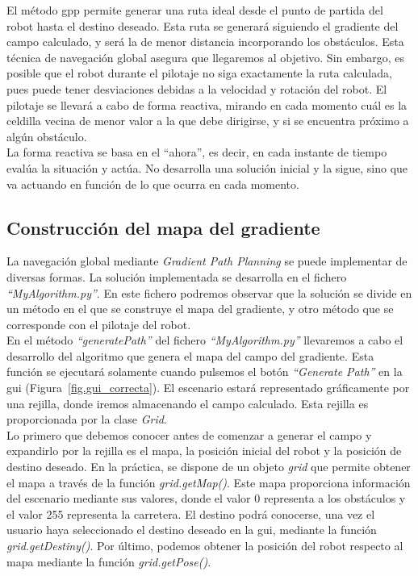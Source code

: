 El método \acrshort{gpp} permite generar una ruta ideal desde el punto de partida del robot hasta el destino deseado. Esta ruta se generará siguiendo el gradiente del campo calculado, y será la de menor distancia incorporando los obstáculos. Esta técnica de navegación global asegura que llegaremos al objetivo. Sin embargo, es posible que el robot durante el pilotaje no siga exactamente la ruta calculada, pues puede tener desviaciones debidas a la velocidad y rotación del robot. El pilotaje se llevará a cabo de forma reactiva, mirando en cada momento cuál es la celdilla vecina de menor valor a la que debe dirigirse, y si se encuentra próximo a algún obstáculo.\\

La forma reactiva se basa en el ``ahora'', es decir, en cada instante de tiempo evalúa la situación y actúa. No desarrolla una solución inicial y la sigue, sino que va actuando en función de lo que ocurra en cada momento.

\subsection{Construcción del mapa del gradiente}
La navegación global mediante \textit{Gradient Path Planning} se puede implementar de diversas formas. La solución implementada  se desarrolla en el fichero \textit{``MyAlgorithm.py''}. En este fichero podremos observar que la solución se divide en un método en el que se construye el mapa del gradiente, y otro método que se corresponde con el pilotaje del robot.\\

En el método \textit{``generatePath''} del fichero \textit{``MyAlgorithm.py''} llevaremos a cabo el desarrollo del algoritmo que genera el mapa del campo del gradiente. Esta función se ejecutará solamente cuando pulsemos el botón \textit{``Generate Path''} en la \acrshort{gui} (Figura~\ref{fig.gui_correcta}). El escenario estará representado gráficamente por una rejilla, donde iremos almacenando el campo calculado. Esta rejilla es proporcionada por la clase \textit{Grid}.\\

Lo primero que debemos conocer antes de comenzar a generar el campo y expandirlo por la rejilla es el mapa, la posición inicial del robot y la posición de destino deseado. En la práctica, se dispone de un objeto \textit{grid} que permite obtener el mapa a través de la función \textit{grid.getMap()}. Este mapa proporciona información del escenario mediante sus valores, donde el valor 0 representa a los obstáculos y el valor 255 representa la carretera. El destino podrá conocerse, una vez el usuario haya seleccionado el destino deseado en la \acrshort{gui}, mediante la función \textit{grid.getDestiny()}. Por último, podemos obtener la posición del robot respecto al mapa mediante la función \textit{grid.getPose()}.

